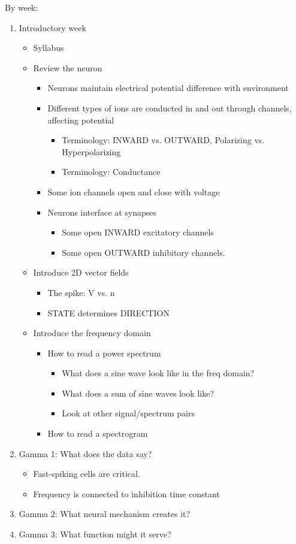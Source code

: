 \documentclass[11pt, reqno]{amsart}
\numberwithin{figure}{section}
\numberwithin{equation}{section}
\begin{document}
By week:
\begin{enumerate}

\item Introductory week
	\begin{itemize}
	\item Syllabus
	\item Review the neuron
		\begin{itemize}
		\item Neurons maintain electrical potential difference with environment
		\item Different types of ions are conducted in and out through channels, affecting potential
			\begin{itemize}
			\item Terminology: INWARD vs. OUTWARD, Polarizing vs. Hyperpolarizing
			\item Terminology: Conductance
			\end{itemize}
		\item Some ion channels open and close with voltage
		\item Neurons interface at synapses
			\begin{itemize}
			\item Some open INWARD excitatory channels
			\item Some open OUTWARD inhibitory channels.
			\end{itemize}
		\end{itemize}
	\item Introduce 2D vector fields
		\begin{itemize}
		\item The spike: V vs. n
		\item STATE determines DIRECTION
		\end{itemize}
	\item Introduce the frequency domain
		\begin{itemize}
		\item How to read a power spectrum
			\begin{itemize}
			\item What does a sine wave look like in the freq domain?
			\item What does a sum of sine waves look like?
			\item Look at other signal/spectrum pairs
			\end{itemize}
		\item How to read a spectrogram
		\end{itemize}
	\end{itemize}
\item Gamma 1: What does the data say?
	\begin{itemize}
	\item Fast-spiking cells are critical.
	\item Frequency is connected to inhibition time constant
	\end{itemize}
\item Gamma 2: What neural mechanism creates it?
\item Gamma 3: What function might it serve?


\end{enumerate}
\end{document}
